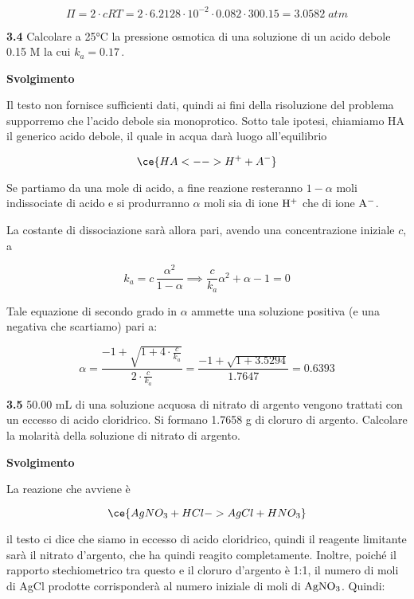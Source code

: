 $$\Pi=2 \cdot cRT
=2 \cdot 6.2128 \cdot 10^{-2} \cdot 0.082 \cdot 300.15
=3.0582\;atm$$

\vspace{0.2cm}\textbf{3.4} Calcolare a 25°C la pressione osmotica di una soluzione di un acido debole 0.15 M la cui $k_a=0.17$\,.

\vspace{0.2cm}\large\textbf{Svolgimento}\normalsize

\vspace{0.2cm}Il testo non fornisce sufficienti dati, quindi ai fini della risoluzione del problema supporremo che l'acido debole sia monoprotico. Sotto tale ipotesi, chiamiamo HA il generico acido debole, il quale in acqua darà luogo all'equilibrio

$$\ce{HA <--> H^+ + A^-}$$

Se partiamo da una mole di acido, a fine reazione resteranno $1 - \alpha$ moli indissociate di acido e si produrranno $\alpha$ moli sia di ione $\rm H^+$ che di ione $\rm A^-$. 

La costante di dissociazione sarà allora pari, avendo una concentrazione iniziale $c$, a

$$k_a=c\,\frac{\alpha^2}{1-\alpha}
\implies
\frac{c}{k_a}\alpha^2 + \alpha -1=0$$

Tale equazione di secondo grado in $\alpha$ ammette una soluzione positiva (e una negativa che scartiamo) pari a:

$$\alpha=\frac{-1 + \sqrt{1 + 4 \cdot \displaystyle \frac{c}{k_a}}}{2 \cdot \displaystyle \frac{c}{k_a}}
=\frac{-1 + \sqrt{1 + 3.5294}}{1.7647}=0.6393$$



\vspace{0.2cm}\textbf{3.5} 50.00 mL di una soluzione acquosa di nitrato di argento vengono trattati con un eccesso di acido
cloridrico. Si formano 1.7658 g di cloruro di argento. Calcolare la molarità della soluzione di nitrato
di argento.

\vspace{0.2cm}\large\textbf{Svolgimento}\normalsize

\vspace{0.2cm}La reazione che avviene è

$$\ce{AgNO_3 + HCl -> AgCl + HNO_3}$$

il testo ci dice che siamo in eccesso di acido cloridrico, quindi il reagente limitante sarà il nitrato d'argento, che ha quindi reagito completamente. Inoltre, poiché il rapporto stechiometrico tra questo e il cloruro d'argento è 1:1, il numero di moli di AgCl prodotte corrisponderà al numero iniziale di moli di $\rm AgNO_3$. Quindi:

